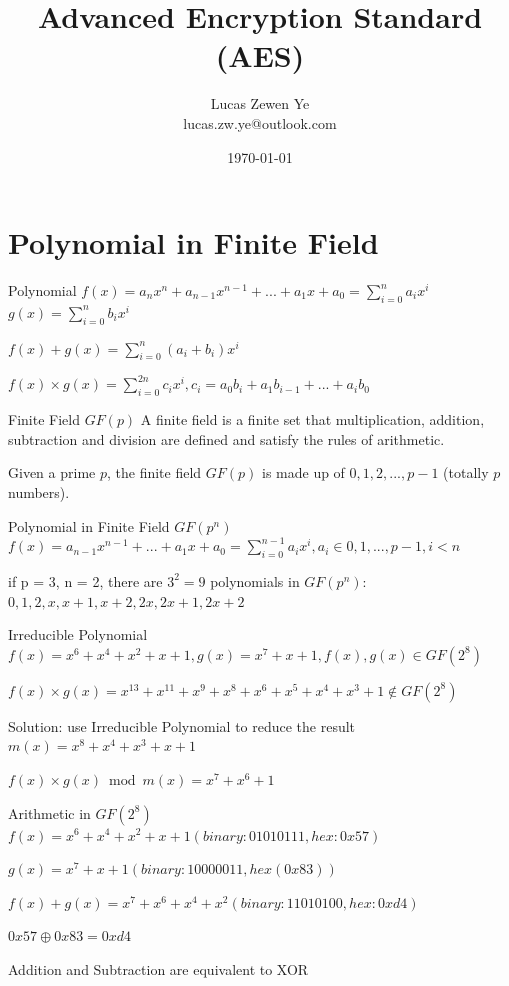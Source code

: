 \documentclass{beamer}
\title{Advanced Encryption Standard (AES)}
\author{ Lucas Zewen Ye \\ lucas.zw.ye@outlook.com }
\date{\today}
\begin{document}
\maketitle

\section{Polynomial in Finite Field}
\begin{frame}{Polynomial}
	$f(x) = a_n x^n + a_{n-1} x^{n-1} + ... + a_1x+a_0 = \sum_{i=0}^n a_i x^i$
	$g(x) = \sum_{i=0}^n b_i x^i$

	$f(x) + g(x) = \sum_{i=0}^n (a_i+b_i) x^i$

	$f(x) \times g(x) = \sum_{i=0}^{2n} c_i x^i, c_i = a_0b_i + a_1b_{i-1} + ... + a_ib_0$
\end{frame}

\begin{frame}{Finite Field $GF(p)$}
	A finite field is a finite set that multiplication, addition, subtraction and division are defined and satisfy the rules of arithmetic.

	Given a \alert{prime} $p$, the finite field $GF(p)$ is made up of $0, 1, 2, ..., p-1$ (totally $p$ numbers).
\end{frame}

\begin{frame}{Polynomial in Finite Field $GF(p^n)$}
	$f(x) = a_{n-1} x^{n-1} + ... + a_1x+a_0 = \sum_{i=0}^{n-1} a_i x^i, a_i \in {0,1,...,p-1}, i<n$

	if p = 3, n = 2, there are $3^2 = 9$ polynomials in $GF(p^n)$:
	$0, 1, 2, x, x + 1, x + 2, 2x, 2x + 1, 2x + 2$
\end{frame}

\begin{frame}{Irreducible Polynomial}
	$f(x) = x^6 + x^4 + x^2 +x +1, g(x) = x^7 +x +1, f(x),g(x) \in GF(2^8)$

	$f(x) \times g(x) = x^{13} + x^{11} + x^9 + x^8+ x^6 + x^5 + x^4 +x^3 + 1 \notin GF(2^8)$

	Solution: use \alert{Irreducible Polynomial} to reduce the result
	$m(x) = x^8+x^4+x^3+x+1$

	$f(x) \times g(x) \bmod m(x) = x^7+x^6+1$
\end{frame}


\begin{frame}{Arithmetic in $GF(2^8)$}
	$f(x) = x^6 + x^4+x^2+x+1 (binary: 01010111, hex: 0x57)$

	$g(x) = x^7 +x +1(binary: 10000011, hex(0x83))$

	$f(x) + g(x) = x^7 + x^6 + x^4 + x^2 (binary: 11010100, hex: 0xd4)$

	$0x57 \oplus 0x83 = 0xd4$

	Addition and Subtraction are equivalent to \alert{XOR}
\end{frame}
\end{document}

